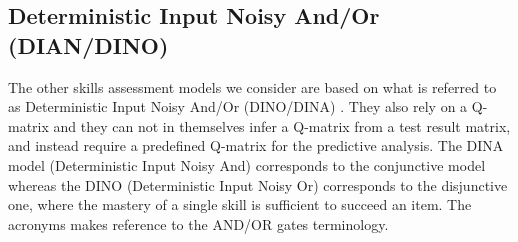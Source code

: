 



\subsection{Deterministic Input Noisy And/Or (DIAN/DINO)}

The other skills assessment models we consider are based on what is referred to as Deterministic Input Noisy And/Or (DINO/DINA) \cite{junker2001cognitive}.  They also rely on a Q-matrix and they can not in themselves infer a Q-matrix from a test result matrix, and instead require a predefined Q-matrix for the predictive analysis. The DINA model (Deterministic Input Noisy And) corresponds to the conjunctive model whereas the DINO (Deterministic Input Noisy Or) corresponds to the disjunctive one, where the mastery of a single skill is sufficient to succeed an item.  The acronyms makes reference to the AND/OR gates terminology.

